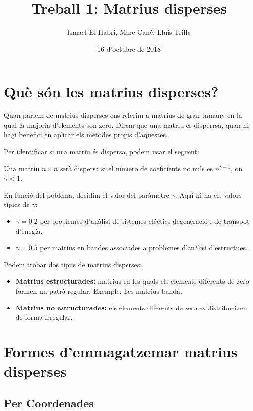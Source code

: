 \documentclass[11pt,a4paper,twoside]{report}
\begin{document}
\title{Treball 1: Matrius disperses}
\author{Ismael El Habri, Marc Cané, Lluís Trilla}
\date{16 d'octubre de 2018}
\maketitle

\tableofcontents


\chapter{Què són les matrius disperses?}

Quan parlem de matrius disperses ens referim a matrius de gran tamany en la qual la majoria d'elements son zero. Direm que 
una matriu és disperrsa, quan hi hagi benefici en aplicar els mètodes propis d'aquestes. 

Per identificar si una matriu és dispersa, podem usar el seguent:

\qquad Una matriu $n \times n$ serà dispersa si el número de coeficients no nuls es $n^{\gamma+1}$, on $\gamma < 1$.

En funció del poblema, decidim el valor del paràmetre $\gamma$. Aquí hi ha els valors típics de $\gamma$:
\begin{itemize}
\item $\gamma=0.2$ per problemes d'anàlisi de sistemes eléctics degeneració i de transpot d'enegía.
\item $\gamma=0.5$ per matrius en bandes associades a problemes d'anàlisi d'estructues.
\end {itemize}



Podem trobar dos tipus de matrius disperses:
\begin{itemize}
\item \textbf{Matrius estructurades:} matrius en les quals els elements diferents de zero formen un patró regular. Exemple: Les matrius banda.
\item \textbf{Matrius no estructurades:} els elements diferents de zero es distribueixen de forma irregular.
\end{itemize}

\chapter{Formes d'emmagatzemar matrius disperses}

\section{Per Coordenades}
\end{document}
